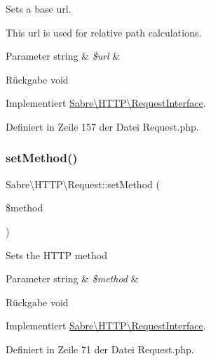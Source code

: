 Sets a base url.

This url is used for relative path calculations.


\begin{DoxyParams}[1]{Parameter}
string & {\em \$url} & \\
\hline
\end{DoxyParams}
\begin{DoxyReturn}{Rückgabe}
void 
\end{DoxyReturn}


Implementiert \mbox{\hyperlink{interface_sabre_1_1_h_t_t_p_1_1_request_interface_a1666fb35c3bad57838f187bf40105be4}{Sabre\textbackslash{}\+H\+T\+T\+P\textbackslash{}\+Request\+Interface}}.



Definiert in Zeile 157 der Datei Request.\+php.

\mbox{\label{class_sabre_1_1_h_t_t_p_1_1_request_a1e8716f1a7f53cac328fdfbda42d35ed}} 
\subsubsection{\texorpdfstring{set\+Method()}{setMethod()}}
{\footnotesize\ttfamily Sabre\textbackslash{}\+H\+T\+T\+P\textbackslash{}\+Request\+::set\+Method (\begin{DoxyParamCaption}\item[{}]{\$method }\end{DoxyParamCaption})}

Sets the H\+T\+TP method


\begin{DoxyParams}[1]{Parameter}
string & {\em \$method} & \\
\hline
\end{DoxyParams}
\begin{DoxyReturn}{Rückgabe}
void 
\end{DoxyReturn}


Implementiert \mbox{\hyperlink{interface_sabre_1_1_h_t_t_p_1_1_request_interface_a91dcec67206436b8439e0256b6388da0}{Sabre\textbackslash{}\+H\+T\+T\+P\textbackslash{}\+Request\+Interface}}.



Definiert in Zeile 71 der Datei Request.\+php.


